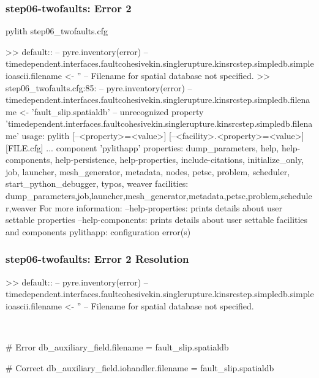 \documentclass[aspectratio=169]{beamer}
\begin{document}
\begin{frame}[fragile]
  \frametitle{{\ttfamily step06-twofaults}: Error 2}

\begin{bashcode}
pylith step06_twofaults.cfg

 >> {default}::
 -- pyre.inventory(error)
 -- timedependent.interfaces.faultcohesivekin.singlerupture.kinsrcstep.simpledb.simpleioascii.filename <- ''
 -- Filename for spatial database not specified.
 >> step06_twofaults.cfg:85:
 -- pyre.inventory(error)
 -- timedependent.interfaces.faultcohesivekin.singlerupture.kinsrcstep.simpledb.filename <- 'fault_slip.spatialdb'
 -- unrecognized property 'timedependent.interfaces.faultcohesivekin.singlerupture.kinsrcstep.simpledb.filename'
usage: pylith [--<property>=<value>] [--<facility>.<property>=<value>] [FILE.cfg] ...
component 'pylithapp'
    properties: dump_parameters, help, help-components, help-persistence, help-properties, include-citations, initialize_only, job, launcher, mesh_generator, metadata, nodes, petsc, problem, scheduler, start_python_debugger, typos, weaver
    facilities: dump_parameters,job,launcher,mesh_generator,metadata,petsc,problem,scheduler,weaver
For more information:
  --help-properties: prints details about user settable properties
  --help-components: prints details about user settable facilities and components
pylithapp: configuration error(s)
\end{bashcode}

\end{frame}


\begin{frame}[t,fragile]
  \frametitle{{\ttfamily step06-twofaults}: Error 2 Resolution}

  \tserror
  \begin{bashcode}
    >> {default}::
    -- pyre.inventory(error)
    -- timedependent.interfaces.faultcohesivekin.singlerupture.kinsrcstep.simpledb.simpleioascii.filename <- ''
    -- Filename for spatial database not specified.
  \end{bashcode}

  \pause\\[1pt]

  \begin{cfgcode}
    # Error
    db_auxiliary_field.filename = fault_slip.spatialdb

    # Correct
    db_auxiliary_field.iohandler.filename = fault_slip.spatialdb
  \end{cfgcode}

\end{frame}
\end{document}
